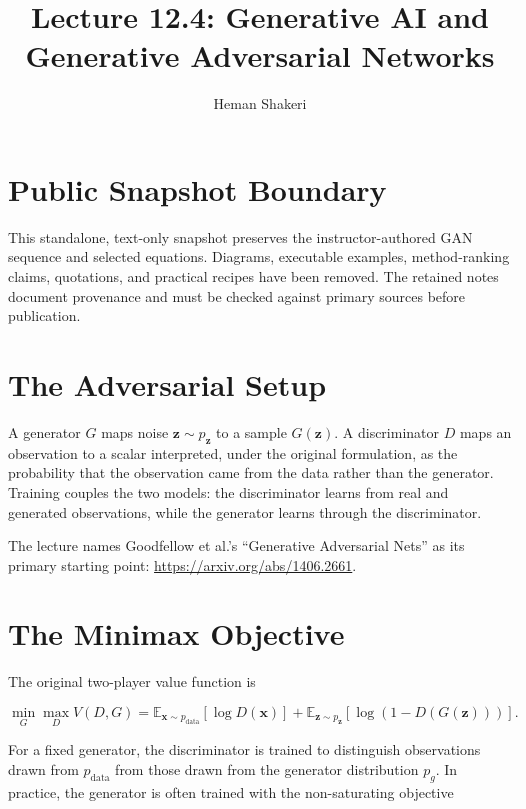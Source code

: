 \documentclass{article}
\title{Lecture 12.4: Generative AI and Generative Adversarial Networks}
\author{Heman Shakeri}
\date{}
\begin{document}
\maketitle

\section*{Public Snapshot Boundary}

This standalone, text-only snapshot preserves the instructor-authored GAN sequence and
selected equations. Diagrams, executable examples, method-ranking claims, quotations,
and practical recipes have been removed. The retained notes document provenance and
must be checked against primary sources before publication.

\section{The Adversarial Setup}

A generator $G$ maps noise $\mathbf{z}\sim p_{\mathbf{z}}$ to a sample
$G(\mathbf{z})$. A discriminator $D$ maps an observation to a scalar interpreted,
under the original formulation, as the probability that the observation came from the
data rather than the generator. Training couples the two models: the discriminator
learns from real and generated observations, while the generator learns through the
discriminator.

The lecture names Goodfellow et al.'s ``Generative Adversarial Nets'' as its primary
starting point: \url{https://arxiv.org/abs/1406.2661}.


\section{The Minimax Objective}

The original two-player value function is

\[
\min_G\max_D V(D,G)
=\mathbb{E}_{\mathbf{x}\sim p_{\mathrm{data}}}
[\log D(\mathbf{x})]
+\mathbb{E}_{\mathbf{z}\sim p_{\mathbf{z}}}
[\log(1-D(G(\mathbf{z})))].
\]

For a fixed generator, the discriminator is trained to distinguish observations drawn
from $p_{\mathrm{data}}$ from those drawn from the generator distribution $p_g$. In
practice, the generator is often trained with the non-saturating objective
\end{document}
